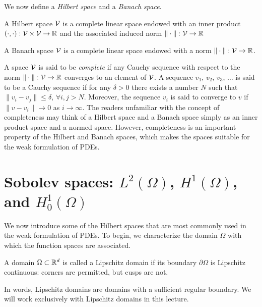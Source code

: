 We now define a \emph{Hilbert space} and a \emph{Banach space}.
\begin{definition}
  A Hilbert space $\mathcal{V}$ is a complete linear space endowed with an inner product $(\cdot,\cdot): \mathcal{V} \times \mathcal{V} \to \mathbb{R}$ and the associated induced norm $\| \cdot \|: \mathcal{V} \to \mathbb{R}$ 
\end{definition}
\begin{definition}
  A Banach space $\mathcal{V}$ is a complete linear space endowed with a norm $\| \cdot \|: \mathcal{V} \to \mathbb{R}$.
\end{definition}
A space $\mathcal{V}$ is said to be \emph{complete} if any Cauchy sequence with respect to the norm $\| \cdot \|: \mathcal{V} \to \mathbb{R}$ converges to an element of $\mathcal{V}$.  A sequence $v_1$, $v_2$, $v_3$, $\dots$ is said to be a Cauchy sequence if for any $\delta > 0$ there exists a number $N$ such that $\| v_i - v_j \| \leq \delta$, $\forall i,j  > N$.  Moreover, the sequence $v_i$ is said to converge to $v$ if $\| v - v_i \| \to 0$ as $i \to \infty$. The readers unfamiliar with the concept of completeness may think of a Hilbert space and a Banach space simply as an inner product space and a normed space. However, completeness is an important property of the Hilbert and Banach spaces, which makes the spaces suitable for the weak formulation of PDEs.

\section{Sobolev spaces: $L^2(\Omega)$, $H^1(\Omega)$, and $H^1_0(\Omega)$}
\label{sec:posnd_sobolev}
We now introduce some of the Hilbert spaces that are most commonly used in the weak formulation of PDEs. To begin, we characterize the domain $\Omega$ with which the function spaces are associated.
\begin{definition}
  A domain $\Omega \subset \mathbb{R}^d$ is called a Lipschitz domain if its boundary $\partial \Omega$ is Lipschitz continuous: corners are permitted, but cusps are not.
\end{definition}
In words, Lipschitz domains are domains with a sufficient regular boundary. We will work exclusively with Lipschitz domains in this lecture.

